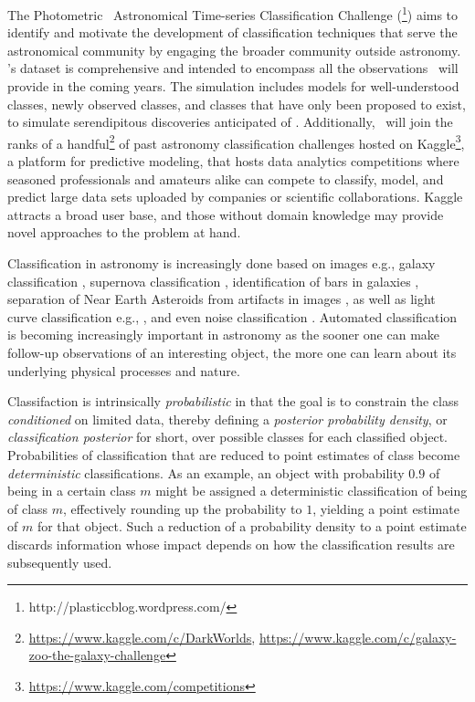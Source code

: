 The Photometric \lsst\ Astronomical Time-series Classification Challenge (\plasticc\footnote{http://plasticcblog.wordpress.com/}) aims to identify and motivate the development of classification techniques that serve the astronomical community by engaging the broader community outside astronomy.
\plasticc's dataset is comprehensive and intended to encompass all the observations \lsst\ will provide in the coming years.
The simulation includes models for well-understood classes, newly observed classes, and classes that have only been proposed to exist, to simulate serendipitous discoveries anticipated of \lsst.
Additionally, \plasticc\ will join the ranks of a handful\footnote{\url{https://www.kaggle.com/c/DarkWorlds}, \url{https://www.kaggle.com/c/galaxy-zoo-the-galaxy-challenge}} of past astronomy classification challenges hosted on Kaggle\footnote{\url{https://www.kaggle.com/competitions}}, a platform for predictive modeling, that hosts data analytics competitions where seasoned professionals and amateurs alike can compete to classify, model, and predict large data sets uploaded by companies or scientific collaborations.
Kaggle attracts a broad user base, and those without domain knowledge may provide novel approaches to the problem at hand.

Classification in astronomy is increasingly done based on images e.g., galaxy classification \citep{hoyle_measuring_2016}, supernova classification \citep{cabrera-vives_deep-hits:_2017}, identification of bars in galaxies \citep{abraham_detection_2018}, separation of Near Earth Asteroids from artifacts in images \citep{morii_machine-learning_2016}, as well as light curve classification e.g., \citet{morii_machine-learning_2016, mahabal_deep-learnt_2017, zevin_gravity_2017}, and even noise classification \citep{zevin_gravity_2017, george_classification_2018}.
Automated classification \citep{djorgovski_towards_2011, djorgovski_flashes_2012, narayan_machine_2018, bloom_automating_2012} is becoming increasingly important in astronomy as the sooner one can make follow-up observations of an interesting object, the more one can learn about its underlying physical processes and nature.

Classifaction is intrinsically \textit{probabilistic} in that the goal is to constrain the class \textit{conditioned} on limited data, thereby defining a \textit{posterior probability density}, or \textit{classification posterior} for short, over possible classes for each classified object.
Probabilities of classification that are reduced to point estimates of class become \textit{deterministic} classifications.
As an example, an object with probability $0.9$ of being in a certain class $m$ might be assigned a deterministic classification of being of class $m$, effectively rounding up the probability to $1$, yielding a point estimate of $m$ for that object.
Such a reduction of a probability density to a point estimate discards information whose impact depends on how the classification results are subsequently used.

